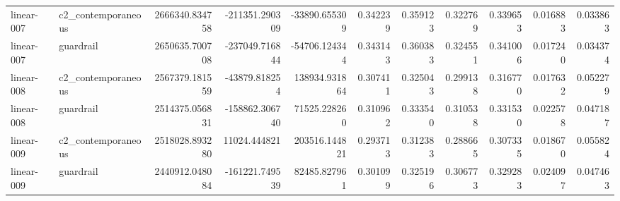 \begin{tabular}{llrrrrrrrrr}
linear-007 & c2\_contemporaneous & 2666340.834758 & -211351.290309 & -33890.655309 & 0.342239 & 0.359123 & 0.322769 & 0.339653 & 0.016883 & 0.033863 \\
linear-007 & guardrail & 2650635.700708 & -237049.716844 & -54706.124344 & 0.343143 & 0.360383 & 0.324551 & 0.341006 & 0.017240 & 0.034374 \\
linear-008 & c2\_contemporaneous & 2567379.181559 & -43879.818254 & 138934.931864 & 0.307411 & 0.325043 & 0.299138 & 0.316770 & 0.017632 & 0.052279 \\
linear-008 & guardrail & 2514375.056831 & -158862.306740 & 71525.228260 & 0.310962 & 0.333540 & 0.310538 & 0.331530 & 0.022578 & 0.047187 \\
linear-009 & c2\_contemporaneous & 2518028.893280 & 11024.444821 & 203516.144821 & 0.293713 & 0.312383 & 0.288665 & 0.307335 & 0.018670 & 0.055824 \\
linear-009 & guardrail & 2440912.048084 & -161221.749539 & 82485.827961 & 0.301099 & 0.325196 & 0.306773 & 0.329283 & 0.024097 & 0.047463 \\
\bottomrule
\end{tabular}
